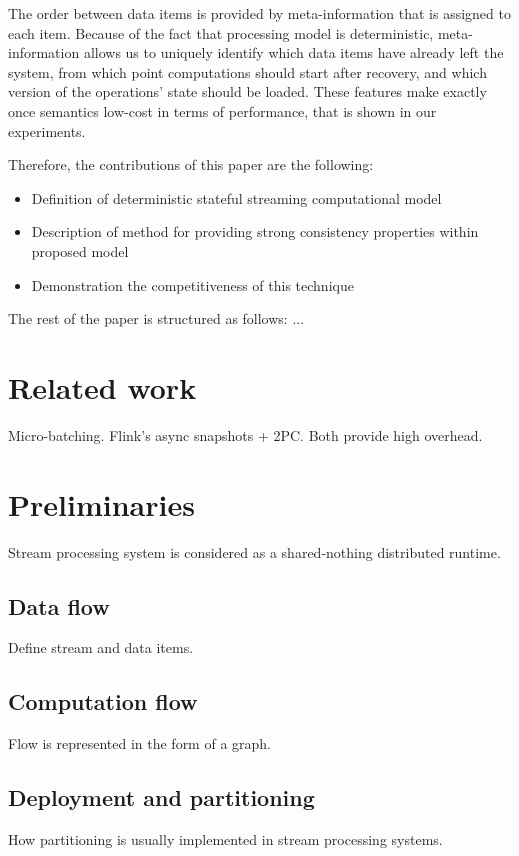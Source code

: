 \documentclass[sigconf]{acmart}
\theoremstyle{remark}
\begin{document}
The order between data items is provided by meta-information that is assigned to each item. Because of the fact that processing model is deterministic, meta-information allows us to uniquely identify which data items have already left the system, from which point computations should start after recovery, and which version of the operations' state should be loaded. These features make exactly once semantics low-cost in terms of performance, that is shown in our experiments.

Therefore, the contributions of this paper are the following: 

\begin {itemize}
\item Definition of deterministic stateful streaming computational model 
\item Description of method for providing strong consistency properties within proposed model 
\item Demonstration the competitiveness of this technique
\end {itemize}

The rest of the paper is structured as follows: ...

\section {Related work}
Micro-batching. Flink's async snapshots + 2PC. Both provide high overhead. 

\section{Preliminaries}
Stream processing system is considered as
a shared-nothing distributed runtime.

\subsection{Data flow}
Define stream and data items.

\subsection{Computation flow}
Flow is represented in the form of a graph.

\subsection{Deployment and partitioning}
How partitioning is usually implemented in stream processing systems.
\end{document}

